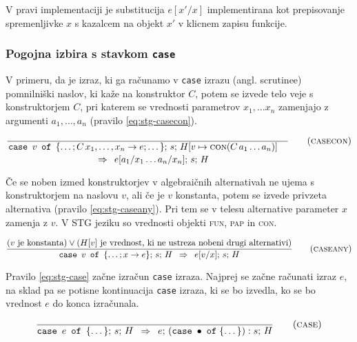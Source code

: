 V pravi implementaciji je substitucija $e[x'/x]$ implementirana kot prepisovanje spremenljivke $x$ s kazalcem na objekt $x'$ v klicnem zapisu funkcije.

\subsubsection{Pogojna izbira s stavkom \texttt{case}}

V primeru, da je izraz, ki ga računamo v \texttt{case} izrazu (angl. scrutinee) pomnilniški naslov, ki kaže na konstruktor $C$, potem se izvede telo veje s konstruktorjem $C$, pri katerem se vrednosti parametrov $x_1, \dots x_n$ zamenjajo z argumenti $a_1, \dots, a_n$ (pravilo \ref{eq:stg-casecon}).

\begin{equation}
	\linfer[casecon]{}{
		\texttt{case} \enspace v \enspace \texttt{of} \enspace \{ \dots; C \, x_1, \dots, x_n \to e; \dots \}; \, s; \, H[v \mapsto \textsc{con}(C \, a_1 \dots a_n)]
	}{
		e[a_1 / x_1 \dots a_n / x_n]; \, s; \, H
	}
\label{eq:stg-casecon}
\end{equation}

Če se noben izmed konstruktorjev v algebraičnih alternativah ne ujema s konstruktorjem na naslovu $v$, ali če je $v$ konstanta, potem se izvede privzeta alternativa (pravilo \ref{eq:stg-caseany}). Pri tem se v telesu alternative parameter $x$ zamenja z $v$. V STG jeziku so vrednosti objekti \textsc{fun}, \textsc{pap} in \textsc{con}.

\begin{equation}
	\infer[caseany]{
		(\text{$v$ je konstanta}) \lor (\text{$H[v]$ je vrednost, ki ne ustreza nobeni drugi alternativi})
	}{
		\texttt{case} \enspace v \enspace \texttt{of} \enspace \{ \dots; x \to e \}; \, s; \, H
	}{
		e[v/x]; \, s; \, H
	}
 \label{eq:stg-caseany}
\end{equation}

Pravilo \ref{eq:stg-case} začne izračun \texttt{case} izraza. Najprej se začne računati izraz $e$, na sklad pa se potisne kontinuacija \texttt{case} izraza, ki se bo izvedla, ko se bo vrednost $e$ do konca izračunala.

\begin{equation}
	\infer[case]{}{
		\texttt{case} \enspace e \enspace \texttt{of} \enspace \{ \dots \}; \, s; \, H
	}{
		e; \, (\texttt{case} \; \bullet \; \texttt{of} \; \{ \dots \}) : s; \, H
	}
\label{eq:stg-case}
\end{equation}

